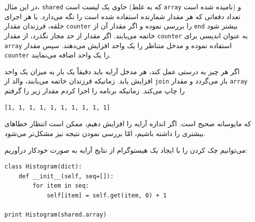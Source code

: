 \documentclass{book}
\begin{document}
    در این مثال، {\tt shared} حاوی یک لیست است (که به غلط {\tt array} نامیده شده است)  و  تعداد دفعاتی که هر مقدار شمارنده استفاده شده است را 
    نگه می‌دارد. 
    با هر اجرای حلقه، فرزندان مقدار {\tt counter} را بررسی نموده و اگر مقدار آن از {\tt end} بیشتر شود خاتمه می‌یابند. 
    اگر مقدار از حد مجاز نگذرد، از مقدار {\tt counter} به عنوان اندیسی برای {\tt array} استفاده نموده و مدخل متناظر را یک واحد افزایش می‌دهند. 
    سپس مقدار {\tt counter}  را یک واحد اضافه می‌نمایند. 

    اگر هر چیز به درستی عمل کند، هر مدخل آرایه باید دقیقاً یک بار به میزان یک واحد افزایش یابد. 
    زمانیکه فرزندان خاتمه می‌یابند، والد  از {\tt join} باز می‌گردد و مقدار  {\tt array} را چاپ می‌کند. 
    زمانیکه برنامه را اجرا کردم مقدار زیر را گرفتم    
%
\begin{verbatim}
[1, 1, 1, 1, 1, 1, 1, 1, 1, 1]
\end{verbatim}
%
    که مایوسانه صحیح است. اگر اندازه آرایه را افزایش دهیم، ممکن است انتظار خطاهای بیشتری را داشته باشیم، امّا بررسی نمودن نتیجه نیز مشکل‌تر می‌شود. 

\newpage
    می‌توانیم چک کردن را با ایجاد یک هیستوگرام از نتایج آرایه به صورت خودکار درآوریم: 

\begin{latin}
\begin{lstlisting}
class Histogram(dict):
    def __init__(self, seq=[]):
        for item in seq:
            self[item] = self.get(item, 0) + 1

print Histogram(shared.array)
\end{lstlisting}
\end{latin}
\end{document}
